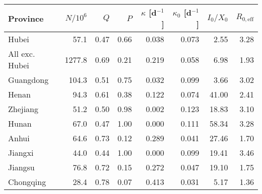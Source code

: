 \begin{tabular}{lrrrrrrr}
\hline
 Province       &   $N/10^6$ &   $Q$ &   $P$ &   $\kappa$ [d$^{-1}$] &   $\kappa_0$ [d$^{-1}$] &   $I_0/X_0$ &   $R_{0,\mathrm{eff}}$ \\
\hline
 Hubei          &       57.1 &  0.47 &  0.66 &                 0.038 &                   0.073 &        2.55 &                   3.28 \\
 All exc. Hubei &     1277.8 &  0.69 &  0.21 &                 0.219 &                   0.058 &        6.98 &                   1.93 \\
 Guangdong      &      104.3 &  0.51 &  0.75 &                 0.032 &                   0.099 &        3.66 &                   3.02 \\
 Henan          &       94.3 &  0.61 &  0.38 &                 0.122 &                   0.074 &       41.00 &                   2.41 \\
 Zhejiang       &       51.2 &  0.50 &  0.98 &                 0.002 &                   0.123 &       18.83 &                   3.10 \\
 Hunan          &       67.0 &  0.47 &  1.00 &                 0.000 &                   0.111 &       58.34 &                   3.28 \\
 Anhui          &       64.6 &  0.73 &  0.12 &                 0.289 &                   0.041 &       27.46 &                   1.70 \\
 Jiangxi        &       44.0 &  0.44 &  1.00 &                 0.000 &                   0.099 &       19.41 &                   3.46 \\
 Jiangsu        &       76.8 &  0.72 &  0.15 &                 0.272 &                   0.047 &       19.10 &                   1.75 \\
 Chongqing      &       28.4 &  0.78 &  0.07 &                 0.413 &                   0.031 &        5.17 &                   1.36 \\
\hline
\end{tabular}